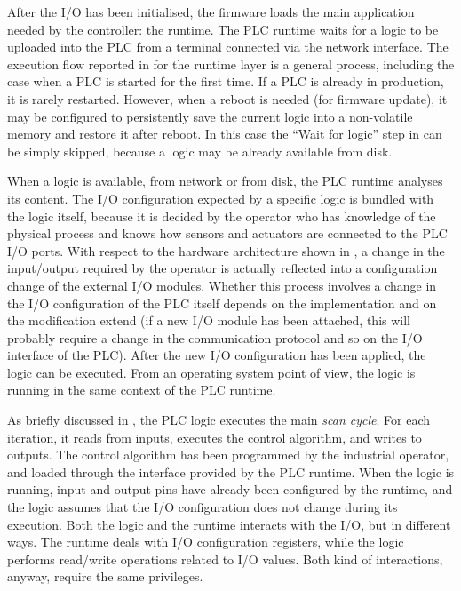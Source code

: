 After the I/O has been initialised, the firmware loads the main application needed by the controller: the runtime.
The PLC runtime waits for a logic to be uploaded into the PLC from a terminal connected via the network interface.
The execution flow reported in  for the runtime layer is a general process, including the case when a PLC is started for the first time.
If a PLC is already in production, it is rarely restarted. However, when a reboot is needed (\eg for firmware update),
it may be configured to persistently save the current logic into a non-volatile memory and restore it after reboot.
In this case the ``Wait for logic'' step in  can be simply skipped, because a logic may be already available from disk.

When a logic is available, from network or from disk, the PLC runtime analyses its content.
The I/O configuration expected by a specific logic is bundled with the logic itself, because it is decided by the operator who has knowledge of the physical process
and knows how sensors and actuators are connected to the PLC I/O ports. With respect to the hardware architecture shown in ,
a change in the input/output required by the operator is actually reflected into a configuration change of the external I/O modules.
Whether this process involves a change in the I/O configuration of the PLC itself depends on the implementation and on the modification extend
(\eg if a new I/O module has been attached, this will probably require a change in the communication protocol and so on the I/O interface of the PLC).
After the new I/O configuration has been applied, the logic can be executed. From an operating system point of view, the logic is running in the same context of the PLC runtime.

As briefly discussed in , the PLC logic executes the main \emph{scan cycle}. For each iteration, it reads from inputs, executes the control algorithm,
and writes to outputs. The control algorithm has been programmed by the industrial operator, and loaded through the interface provided by the PLC runtime.
When the logic is running, input and output pins have already been configured by the runtime, and the logic assumes that the I/O configuration does not change during its execution.
Both the logic and the runtime interacts with the I/O, but in different ways. The runtime deals with I/O configuration registers, while the logic performs read/write operations
related to I/O values. Both kind of interactions, anyway, require the same privileges.



